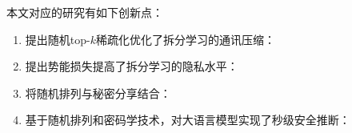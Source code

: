 本文对应的研究有如下创新点：
\begin{enumerate}
    \item 提出随机top-$k$稀疏化优化了拆分学习的通讯压缩：
    \item 提出势能损失提高了拆分学习的隐私水平：
    \item 将随机排列与秘密分享结合：
    \item 基于随机排列和密码学技术，对大语言模型实现了秒级安全推断：
\end{enumerate}